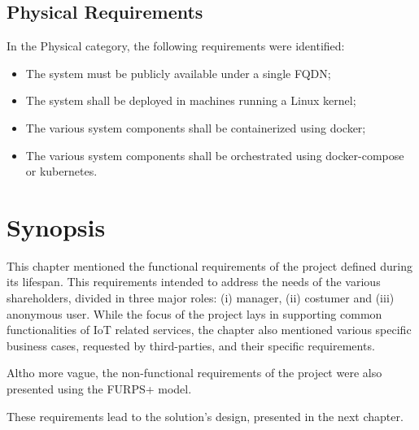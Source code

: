 \subsection{Physical Requirements}
\label{sec:requirements:non_functional:physical}

In the Physical category, the following requirements were identified:

\begin{itemize}
    \item The system must be publicly available under a single \gls{FQDN};
    \item The system shall be deployed in machines running a Linux kernel;
    \item The various system components shall be containerized using docker;
    \item The various system components shall be orchestrated using docker-compose or kubernetes.
\end{itemize}

\section{Synopsis}
\label{sec:requirements:synopsis}

This chapter mentioned the functional requirements of the project defined during its lifespan. This requirements intended to address the needs of the various shareholders, divided in three major roles: (i) manager, (ii) costumer and (iii) anonymous user. While the focus of the project lays in supporting common functionalities of \gls{IoT} related services, the chapter also mentioned various specific business cases, requested by third-parties, and their specific requirements.

Altho more vague, the non-functional requirements of the project were also presented using the FURPS+ model.

These requirements lead to the solution's design, presented in the next chapter.
